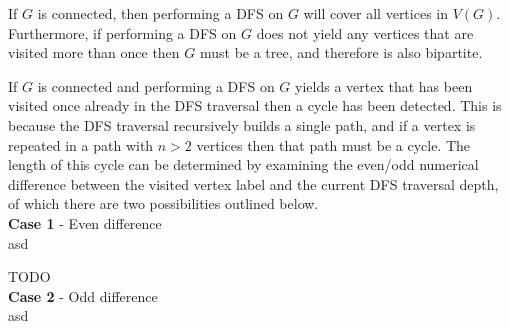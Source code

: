 \documentclass[a4paper,10pt]{article}
\begin{document}
If $G$ is connected, then performing a DFS on $G$ will cover all vertices in $V(G)$. Furthermore, if performing a DFS on $G$ does not yield any vertices that are visited more than once then $G$ must be a tree, and therefore is also bipartite. 

If $G$ is connected and performing a DFS on $G$ yields a vertex that has been visited once already in the DFS traversal then a cycle has been detected. This is because the DFS traversal recursively builds a single path, and if a vertex is repeated in a path with $n > 2$ vertices then that path must be a cycle. The length of this cycle can be determined by examining the even/odd numerical difference between the visited vertex label and the current DFS traversal depth, of which there are two possibilities outlined below. \\ 

{\bf Case 1} - Even difference\\
asd  

TODO \\

{\bf Case 2} - Odd difference \\
asd

\end{document}

